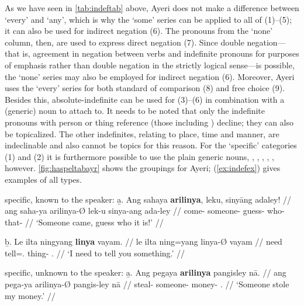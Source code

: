 As we have seen in \autoref{tab:indeftab} above, Ayeri does not make a
difference between `every' and `any', which is why the `some' series can be
applied to all of (1)--(5); it can also be used for indirect negation (6). The
pronouns from the `none' column, then, are used to express direct negation (7).
Since double negation---that is, agreement in negation between verbs and
indefinite pronouns for purposes of emphasis rather than double negation in the
strictly logical sense---is possible, the `none' series may also be employed
for indirect negation (6). Moreover, Ayeri uses the `every' series for both
standard of comparison (8) and free choice (9). Besides this, 
absolute-indefinite  can be used for (3)--(6) in combination 
with a (generic) noun to attach to. It needs to be noted that only the 
indefinite pronouns with person or thing reference (those including 
) decline; they can also be topicalized. The other indefinites, 
relating to place, time and manner, are indeclinable and also cannot be topics 
for this reason.
%
%
For the `specific' categories (1) and (2) it is furthermore possible to use the
plain generic nouns, , ,
, , , 
however. \autoref{fig:haspeltabayr} shows the groupings for Ayeri; 
(\ref{ex:indefex}) gives examples of all types.

\pex[labeltype=numeric,interpartskip=1em]\label{ex:indefex}
\a specific, known to the speaker:\vspace{.5em} %
	\beginsubsub
	\b{a.} \begingl
		\gla Ang sahaya \textbf{arilinya}, leku, sinyāng adaley! //
		\glb ang saha-ya arilinya-Ø lek-u sinya-ang ada-ley //
		\glc \AgtT{} come-\TsgM{} someone-\Top{} guess-\Imp{} 
			who-\Aarg{} that-\PargI{} //
		\glft `Someone came, guess who it is!' //
		\endgl\vspace{.5em}
		
	\b{b.} \begingl
		\gla Le ilta ningyang \textbf{linya} vayam. //
		\glb le ilta ning=yang linya-Ø vayam //
		\glc \PatTI{} need tell=\Fsg{}.\Aarg{} thing-\Top{} 
			\Ssg{}.\Dat{} //
		\glft `I need to tell you something.' //
		\endgl
	\endsubsub

\a specific, unknown to the speaker:\vspace{.5em} %
	\beginsubsub
	\b{a.} \begingl
		\gla Ang pegaya \textbf{arilinya} pangisley nā. //
		\glb ang pega-ya arilinya-Ø pangis-ley nā //
		\glc \AgtT{} steal-\TsgM{} someone-\Top{} money-\PargI{} 
			\Fsg{}.\Gen{} //
		\glft `Someone stole my money.' //
		\endgl\vspace{.5em}
		
